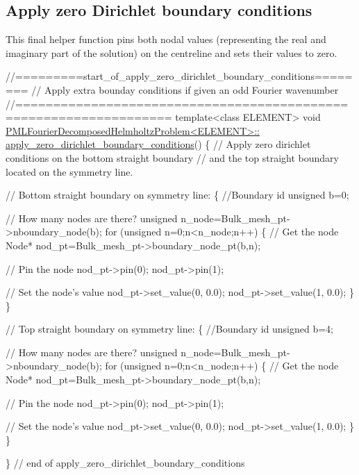 \hypertarget{index_app_z_bc}{}\subsection{Apply zero Dirichlet boundary conditions}\label{index_app_z_bc}
This final helper function pins both nodal values (representing the real and imaginary part of the solution) on the centreline and sets their values to zero.

 
\begin{DoxyCodeInclude}
\textcolor{comment}{//=========start\_of\_apply\_zero\_dirichlet\_boundary\_conditions========}
\textcolor{comment}{// Apply extra bounday conditions if given an odd Fourier wavenumber}
\textcolor{comment}{//==================================================================}
\textcolor{keyword}{template}<\textcolor{keyword}{class} ELEMENT>
\textcolor{keywordtype}{void} \hyperlink{classPMLFourierDecomposedHelmholtzProblem_ad7680c25a32087cb6da96d4bcedf1b23}{PMLFourierDecomposedHelmholtzProblem<ELEMENT>::}
\hyperlink{classPMLFourierDecomposedHelmholtzProblem_ad7680c25a32087cb6da96d4bcedf1b23}{apply\_zero\_dirichlet\_boundary\_conditions}()
\{
 \textcolor{comment}{// Apply zero dirichlet conditions on the bottom straight boundary}
 \textcolor{comment}{// and the top straight boundary located on the symmetry line.}

 \textcolor{comment}{// Bottom straight boundary on symmetry line:}
 \{
  \textcolor{comment}{//Boundary id}
  \textcolor{keywordtype}{unsigned} b=0;

  \textcolor{comment}{// How many nodes are there?}
  \textcolor{keywordtype}{unsigned} n\_node=Bulk\_mesh\_pt->nboundary\_node(b);
  \textcolor{keywordflow}{for} (\textcolor{keywordtype}{unsigned} n=0;n<n\_node;n++)
   \{
    \textcolor{comment}{// Get the node}
    Node* nod\_pt=Bulk\_mesh\_pt->boundary\_node\_pt(b,n);

    \textcolor{comment}{// Pin the node}
    nod\_pt->pin(0);
    nod\_pt->pin(1);

    \textcolor{comment}{// Set the node's value}
    nod\_pt->set\_value(0, 0.0);
    nod\_pt->set\_value(1, 0.0);
   \}
 \}

\textcolor{comment}{// Top straight boundary on symmetry line:}
 \{
  \textcolor{comment}{//Boundary id}
  \textcolor{keywordtype}{unsigned} b=4;

  \textcolor{comment}{// How many nodes are there?}
  \textcolor{keywordtype}{unsigned} n\_node=Bulk\_mesh\_pt->nboundary\_node(b);
  \textcolor{keywordflow}{for} (\textcolor{keywordtype}{unsigned} n=0;n<n\_node;n++)
   \{
    \textcolor{comment}{// Get the node}
    Node* nod\_pt=Bulk\_mesh\_pt->boundary\_node\_pt(b,n);

    \textcolor{comment}{// Pin the node}
    nod\_pt->pin(0);
    nod\_pt->pin(1);

    \textcolor{comment}{// Set the node's value}
    nod\_pt->set\_value(0, 0.0);
    nod\_pt->set\_value(1, 0.0);
   \}
 \}


\} \textcolor{comment}{// end of apply\_zero\_dirichlet\_boundary\_conditions}

\end{DoxyCodeInclude}





